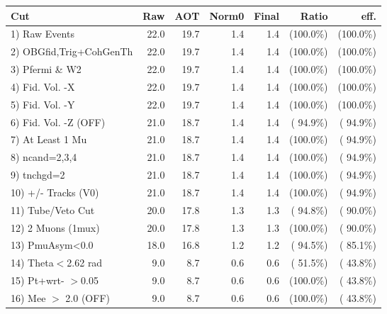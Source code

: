  \begin{table}[h!]\centering
 \begin{tabular}{||l||r|r|r|r|r|r||}
 \hline
 \hline
 Cut & Raw & AOT & Norm0 & Final & Ratio & eff.       \\
 \hline
  1) Raw Events           &         22.0 &         19.7 &          1.4 &          1.4 & (100.0\%) & (100.0\%) \\
  2) OBGfid,Trig+CohGenTh &         22.0 &         19.7 &          1.4 &          1.4 & (100.0\%) & (100.0\%) \\
  3) Pfermi \& W2         &         22.0 &         19.7 &          1.4 &          1.4 & (100.0\%) & (100.0\%) \\
  4) Fid. Vol. -X         &         22.0 &         19.7 &          1.4 &          1.4 & (100.0\%) & (100.0\%) \\
  5) Fid. Vol. -Y         &         22.0 &         19.7 &          1.4 &          1.4 & (100.0\%) & (100.0\%) \\
  6) Fid. Vol. -Z (OFF)   &         21.0 &         18.7 &          1.4 &          1.4 & ( 94.9\%) & ( 94.9\%) \\
  7) At Least 1 Mu        &         21.0 &         18.7 &          1.4 &          1.4 & (100.0\%) & ( 94.9\%) \\
  8) ncand=2,3,4          &         21.0 &         18.7 &          1.4 &          1.4 & (100.0\%) & ( 94.9\%) \\
  9) tnchgd=2             &         21.0 &         18.7 &          1.4 &          1.4 & (100.0\%) & ( 94.9\%) \\
 10) +/- Tracks (V0)      &         21.0 &         18.7 &          1.4 &          1.4 & (100.0\%) & ( 94.9\%) \\
 11) Tube/Veto Cut        &         20.0 &         17.8 &          1.3 &          1.3 & ( 94.8\%) & ( 90.0\%) \\
 12) 2 Muons (1mux)       &         20.0 &         17.8 &          1.3 &          1.3 & (100.0\%) & ( 90.0\%) \\
 13) PmuAsym<0.0          &         18.0 &         16.8 &          1.2 &          1.2 & ( 94.5\%) & ( 85.1\%) \\
 14) Theta$<$2.62 rad     &          9.0 &          8.7 &          0.6 &          0.6 & ( 51.5\%) & ( 43.8\%) \\
 15) Pt+wrt- $>$0.05      &          9.0 &          8.7 &          0.6 &          0.6 & (100.0\%) & ( 43.8\%) \\
 16) Mee $>$ 2.0  (OFF)   &          9.0 &          8.7 &          0.6 &          0.6 & (100.0\%) & ( 43.8\%) \\

\end{tabular}
\end{table}

